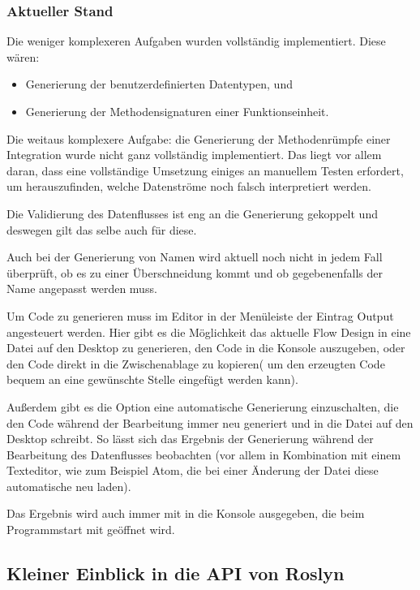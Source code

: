 \subsubsection{Aktueller Stand}

Die weniger komplexeren Aufgaben wurden vollständig implementiert.
Diese wären: 
\begin{itemize}
	\item Generierung der benutzerdefinierten Datentypen, und 
	\item Generierung der Methodensignaturen einer Funktionseinheit.
\end{itemize}

Die weitaus komplexere Aufgabe: die Generierung der Methodenrümpfe einer Integration wurde nicht ganz vollständig implementiert.
Das liegt vor allem daran, dass eine vollständige Umsetzung einiges an manuellem Testen erfordert, um herauszufinden, welche Datenströme noch falsch interpretiert werden. 

Die Validierung des Datenflusses ist eng an die Generierung gekoppelt und deswegen gilt das selbe auch für diese. 

Auch bei der Generierung von Namen wird aktuell noch nicht in jedem Fall überprüft, ob es zu einer Überschneidung kommt und ob gegebenenfalls der Name angepasst werden muss.

\bigskip

Um Code zu generieren muss im Editor in der Menüleiste der Eintrag Output angesteuert werden.
Hier gibt es die Möglichkeit das aktuelle Flow Design in eine Datei auf den Desktop zu
generieren, den Code in die Konsole auszugeben, oder den Code direkt in die Zwischenablage zu kopieren( um den erzeugten Code bequem an eine gewünschte Stelle eingefügt werden kann).

Außerdem gibt es die Option eine automatische Generierung einzuschalten, die
den Code während der Bearbeitung immer neu generiert und in die Datei
auf den Desktop schreibt. So lässt sich das Ergebnis der Generierung während der Bearbeitung
des Datenflusses beobachten (vor allem in Kombination mit einem
Texteditor, wie zum Beispiel Atom, die bei einer Änderung der Datei diese automatische neu laden).

Das Ergebnis wird auch immer mit in die Konsole ausgegeben, die beim
Programmstart mit geöffnet wird.


\subsection{Kleiner Einblick in die API von Roslyn}

